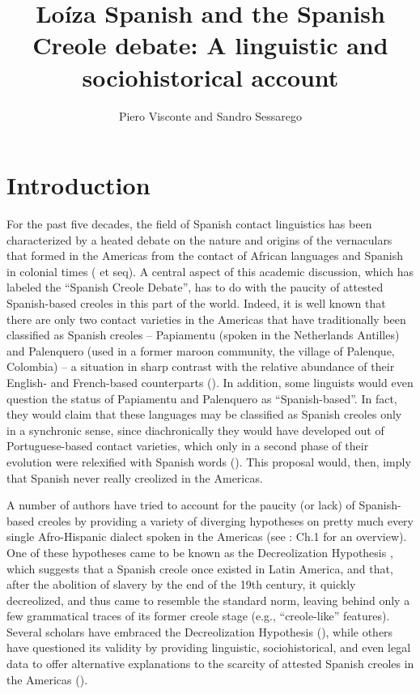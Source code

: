 \documentclass[output=paper,colorlinks,citecolor=brown]{langscibook}
\author{Piero Visconte \affiliation{University of Texas, Austin} and {Sandro Sessarego} \affiliation{University of Texas, Austin}}
\title[Loíza Spanish and the Spanish Creole debate]{Loíza Spanish and the Spanish Creole debate: A linguistic and sociohistorical account}
\begin{document}
\maketitle

\section{Introduction}
For the past five decades, the field of Spanish contact linguistics has been characterized by a heated debate on the nature and origins of the vernaculars that formed in the Americas from the contact of African languages and Spanish in colonial times (\citealt{Grandade1968} et seq). A central aspect of this academic discussion, which \citet[Ch. 9]{Lipski2005} has labeled the “Spanish Creole Debate”, has to do with the paucity of attested Spanish-based creoles in this part of the world. Indeed, it is well known that there are only two contact varieties in the Americas that have traditionally been classified as Spanish creoles -- Papiamentu (spoken in the Netherlands Antilles) and Palenquero (used in a former maroon community, the village of Palenque, Colombia) -- a situation in sharp contrast with the relative abundance of their English- and French-based counterparts (\citealt{HolmPatrick2007}). In addition, some linguists would even question the status of Papiamentu and Palenquero as “Spanish-based”. In fact, they would claim that these languages may be classified as Spanish creoles only in a synchronic sense, since diachronically they would have developed out of Portuguese-based contact varieties, which only in a second phase of their evolution were relexified with Spanish words (\citealt{Schwegler1996,Martinus1996,McWhorter2000,Jacobs2012}). This proposal would, then, imply that Spanish never really creolized in the Americas.

A number of authors have tried to account for the paucity (or lack) of Spanish-based creoles by providing a variety of diverging hypotheses on pretty much every single Afro-Hispanic dialect spoken in the Americas (see \citealt{Sessarego2021}: Ch.1 for an overview). One of these hypotheses came to be known as the Decreolization Hypothesis \citep{Grandade1978}, which suggests that a Spanish creole once existed in Latin America, and that, after the abolition of slavery by the end of the 19th century, it quickly decreolized, and thus came to resemble the standard norm, leaving behind only a few grammatical traces of its former creole stage (e.g., “creole-like” features). Several scholars have embraced the Decreolization Hypothesis (\citealt{Perlschwegler1998,Schwegler1999,Otheguy1973,Megenney1993,Guy2017}), while others have questioned its validity by providing linguistic, sociohistorical, and even legal data to offer alternative explanations to the scarcity of attested Spanish creoles in the Americas (\citealt{Mintz1971,laurence1974caribbean,Lipski1993,McWhorter2000,Sessarego2017}).
\end{document}
